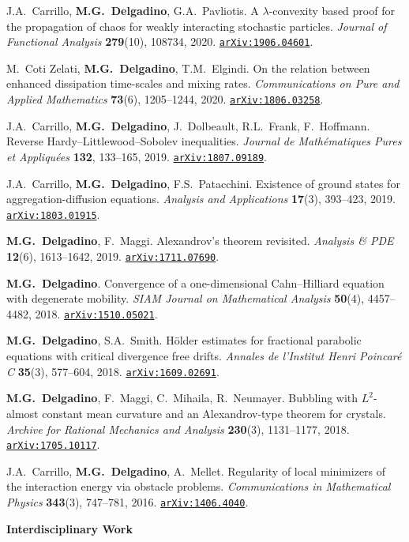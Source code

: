 \documentclass[11pt]{article}
\newcommand{\pub}[2]{%
  \par\addvspace{0.5ex}\noindent
  \begin{list}{}{%
    \setlength{\leftmargin}{2.4em}%
    \setlength{\labelwidth}{2.4em}%
    \setlength{\labelsep}{0.3em}%
  }%
  \item[{[#1]}] #2
  \end{list}
}
\newcommand{\arxiv}[1]{\href{https://arxiv.org/abs/#1}{\texttt{arXiv:#1}}}
\begin{document}
\pub{9}{J.A.~Carrillo, \textbf{M.G.~Delgadino}, G.A.~Pavliotis. A $\lambda$-convexity based proof for the propagation of chaos for weakly interacting stochastic particles. \emph{Journal of Functional Analysis} \textbf{279}(10), 108734, 2020. \arxiv{1906.04601}.}

\pub{8}{M.~Coti Zelati, \textbf{M.G.~Delgadino}, T.M.~Elgindi. On the relation between enhanced dissipation time-scales and mixing rates. \emph{Communications on Pure and Applied Mathematics} \textbf{73}(6), 1205--1244, 2020. \arxiv{1806.03258}.}

\pub{7}{J.A.~Carrillo, \textbf{M.G.~Delgadino}, J.~Dolbeault, R.L.~Frank, F.~Hoffmann. Reverse Hardy--Littlewood--Sobolev inequalities. \emph{Journal de Math\'ematiques Pures et Appliqu\'ees} \textbf{132}, 133--165, 2019. \arxiv{1807.09189}.}

\pub{6}{J.A.~Carrillo, \textbf{M.G.~Delgadino}, F.S.~Patacchini. Existence of ground states for aggregation-diffusion equations. \emph{Analysis and Applications} \textbf{17}(3), 393--423, 2019. \arxiv{1803.01915}.}

\pub{5}{\textbf{M.G.~Delgadino}, F.~Maggi. Alexandrov's theorem revisited. \emph{Analysis \& PDE} \textbf{12}(6), 1613--1642, 2019. \arxiv{1711.07690}.}

\pub{4}{\textbf{M.G.~Delgadino}. Convergence of a one-dimensional Cahn--Hilliard equation with degenerate mobility. \emph{SIAM Journal on Mathematical Analysis} \textbf{50}(4), 4457--4482, 2018. \arxiv{1510.05021}.}

\pub{3}{\textbf{M.G.~Delgadino}, S.A.~Smith. H\"older estimates for fractional parabolic equations with critical divergence free drifts. \emph{Annales de l'Institut Henri Poincar\'e C} \textbf{35}(3), 577--604, 2018. \arxiv{1609.02691}.}

\pub{2}{\textbf{M.G.~Delgadino}, F.~Maggi, C.~Mihaila, R.~Neumayer. Bubbling with $L^2$-almost constant mean curvature and an Alexandrov-type theorem for crystals. \emph{Archive for Rational Mechanics and Analysis} \textbf{230}(3), 1131--1177, 2018. \arxiv{1705.10117}.}

\pub{1}{J.A.~Carrillo, \textbf{M.G.~Delgadino}, A.~Mellet. Regularity of local minimizers of the interaction energy via obstacle problems. \emph{Communications in Mathematical Physics} \textbf{343}(3), 747--781, 2016. \arxiv{1406.4040}.}

\vspace{0.8em}\noindent\textbf{Interdisciplinary Work}\\[0.3em]
\end{document}
